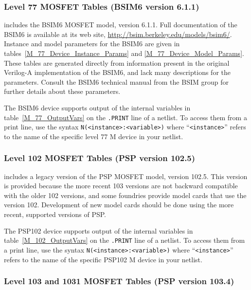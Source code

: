 


\clearpage
\subsubsection{Level 77 MOSFET Tables (BSIM6 version 6.1.1)}
\Xyce{} includes the BSIM6 MOSFET model, version 6.1.1.  Full
documentation of the BSIM6 is available at its web site,
\url{http://bsim.berkeley.edu/models/bsim6/}.  Instance and model
parameters for the BSIM6 are given in
tables~\ref{M_77_Device_Instance_Params} and
\ref{M_77_Device_Model_Params}.  These tables are generated directly
from information present in the original Verilog-A implementation of
the BSIM6, and lack many descriptions for the parameters.  Consult the
BSIM6 technical manual from the BSIM group for further details about
these parameters.

The BSIM6 device supports output of the internal variables in
table~\ref{M_77_OutputVars} on the \texttt{.PRINT} line of a netlist.
To access them from a print line, use the syntax
\texttt{N(<instance>:<variable>)} where ``\texttt{<instance>}'' refers to the
name of the specific level 77 M device in your netlist.





\clearpage
\subsubsection{Level 102 MOSFET Tables (PSP version 102.5)}

\Xyce{} includes a legacy version of the PSP MOSFET model, version
102.5.  This version is provided because the more recent 103 versions
are not backward compatible with the older 102 versions, and some
foundries provide model cards that use the version 102.  Development
of new model cards should be done using the more recent, supported
versions of PSP.

The PSP102 device supports output of the internal variables in
table~\ref{M_102_OutputVars} on the \texttt{.PRINT} line of a netlist.
To access them from a print line, use the syntax
\texttt{N(<instance>:<variable>)} where ``\texttt{<instance>}'' refers to the
name of the specific PSP102 M device in your netlist.





\subsubsection{Level 103 and 1031 MOSFET Tables (PSP version 103.4)}


